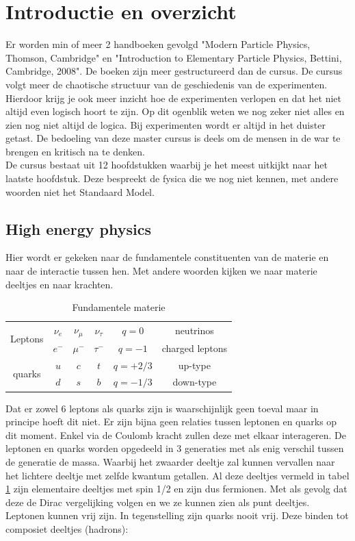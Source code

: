 \documentclass[../main.tex]{subfiles}
\begin{document}
\section{Introductie en overzicht}%
\label{sec:introductie_en_overzicht}

Er worden min of meer 2 handboeken gevolgd "Modern Particle Physics, Thomson, Cambridge" en "Introduction to Elementary Particle Physics,  Bettini, Cambridge, 2008". De boeken zijn meer gestructureerd dan de cursus. De cursus volgt meer de chaotische structuur van de geschiedenis van de experimenten. Hierdoor krijg je ook meer inzicht hoe de experimenten verlopen en dat het niet altijd even logisch hoort te zijn. Op dit ogenblik weten we nog zeker niet alles en zien nog niet altijd de logica. Bij experimenten wordt er altijd in het duister getast. De bedoeling van deze master cursus is deels om de mensen in de war te brengen en kritisch na te denken.\\
De cursus bestaat uit 12 hoofdstukken waarbij je het meest uitkijkt naar het laatste hoofdstuk. Deze bespreekt de fysica die we nog niet kennen, met andere woorden niet het Standaard Model.

\subsection{High energy physics}%
\label{sub:high_energy_physics}
Hier wordt er gekeken naar de fundamentele constituenten van de materie en naar de interactie tussen hen. Met andere woorden kijken we naar materie deeltjes en naar krachten.

\begin{table}[h]
    \centering
    \caption{Fundamentele materie}
    \label{tab:fund_mat}
    \begin{tabular}{cc|c|ccc}
        \multicolumn{1}{c}{\multirow{2}{*}{Leptons}} & $\nu_e$ & $\nu_\mu$ & $\nu_\tau$ & $q=0$ & neutrinos \\
        \multicolumn{1}{c}{}                         & $e^-$ & $\mu^-$ & $\tau^-$ & $q=-1$ & charged leptons \\ \hline
        \multirow{2}{*}{quarks}                      & $u$ & $c$ & $t$ & $q=+2/3$ & up-type \\
                                                     & $d$ & $s$ & $b$ & $q=-1/3$ & down-type
    \end{tabular}
\end{table}

Dat er zowel 6 leptons als quarks zijn is waarschijnlijk geen toeval maar in principe hoeft dit niet. Er zijn bijna geen relaties tussen leptonen en quarks op dit moment. Enkel via de Coulomb kracht zullen deze met elkaar interageren. De leptonen en quarks worden opgedeeld in 3 generaties met als enig verschil tussen de generatie de massa. Waarbij het zwaarder deeltje zal kunnen vervallen naar het lichtere deeltje met zelfde kwantum getallen. Al deze deeltjes vermeld in tabel \ref{tab:fund_mat} zijn elementaire deeltjes met spin 1/2 en zijn dus fermionen. Met als gevolg dat deze de Dirac vergelijking volgen en we ze kunnen zien als punt deeltjes.\\
Leptonen kunnen vrij zijn. In tegenstelling zijn quarks nooit vrij. Deze binden tot composiet deeltjes (hadrons):
\end{document}
